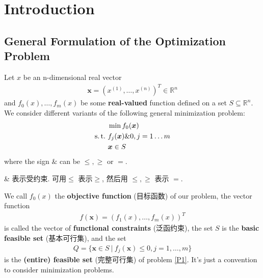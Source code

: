 \newpage
\section{Introduction}
\subsection{\small General Formulation of the Optimization Problem}

Let $x$ be an n-dimensional real vector
\begin{align*}
    \bm{x}=\left( x^{(1)}, \dots, x^{(n)} \right)^T\in \mathbb{R}^n
\end{align*}
and $f_0(x),\dots,f_m(x)$ be some \textbf{real-valued} function defined  on a set $S\subseteq \mathbb{R}^n$. We consider different variants of the following general minimization problem:
\begin{align}
    \notag &\min f_0(\bm x)\\
    \label{P1} \st &f_j(\bm x) \& 0, j=1\dots m\\
    \notag  &\bm{x} \in S
\end{align}
where the sign $\&$ can be $\le, \ge$ or $=$. 

\& 表示受约束. 可用$\le$ 表示$\ge$, 然后用 $\le, \ge$ 表示 $=$. 

We call $f_0(x)$ the \textbf{objective function} (目标函数) of our problem, the vector function
\begin{align*}
    f(\bm x)=\left( f_1(x),\dots,f_m(x) \right)^T
\end{align*}
is called the vector of \textbf{functional constraints} (泛函约束), the set $S$ is the \textbf{basic feasible set} (基本可行集), and the set
\begin{align*}
    Q=\{ \bm x \in S\ |\ f_j(\bm x)\le 0,j=1,\dots,m \}
\end{align*}
is the \textbf{(entire) feasible set} (完整可行集) of problem \ref{P1}. It's just a convention to consider minimization problems. 

